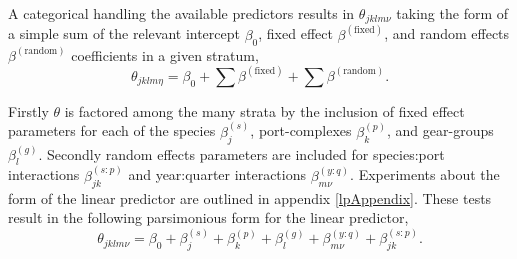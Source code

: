 \documentclass[12pt]{article}
\begin{document}
%
A categorical handling the available predictors results in $\theta_{jklm\nu}$ 
taking the form of a simple sum of the relevant intercept $\beta_0$, fixed 
effect $\beta^{(\text{fixed})}$, and random effects $\beta^{(\text{random})}$ 
coefficients in a given stratum, 
%
\begin{equation}
\theta_{jklm\eta} = \beta_0 + \sum\beta^{(\text{fixed})} + \sum\beta^{(\text{random})}.
\end{equation}

%
Firstly $\theta$ is factored among the many strata by the inclusion of 
fixed effect parameters for each of the species $\beta^{(s)}_j$, 
port-complexes $\beta^{(p)}_k$, and gear-groups $\beta^{(g)}_l$. Secondly 
random effects parameters are included for species:port interactions 
$\beta^{(s:p)}_{jk}$ and year:quarter interactions $\beta^{(y:q)}_{m\nu}$.
Experiments about the form of the linear predictor are outlined in appendix 
\ref{lpAppendix}. 
These tests result in the following parsimonious form for the linear predictor,
%
\begin{equation}
\theta_{jklm\nu} = \beta_0 + \beta^{(s)}_j + \beta^{(p)}_k + \beta^{(g)}_l + \beta^{(y:q)}_{m\nu} + \beta^{(s:p)}_{jk}.
\end{equation}

%
%
\end{document}
